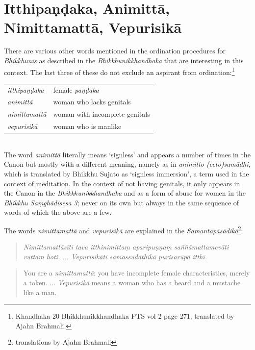 \section{Itthipaṇḍaka, Animittā, Nimittamattā, Vepurisikā}

There are various other words mentioned in the ordination procedures for {\em Bhikkhunīs} as described in the {\em Bhikkhunikkhandhaka} that are interesting in this context. The last three of these do not exclude an aspirant from ordination:\footnote{Khandhaka 20 Bhikkhunikkhandhaka PTS vol 2 page 271, translated by Ajahn Brahmali.} \\

\begin{tabular}{ l l }
 {\em itthipaṇḍaka} & female {\em paṇḍaka} \\
 {\em animittā } & woman who lacks genitals \\
 {\em nimittamattā } & woman with incomplete genitals \\ 
 {\em vepurisikā } & woman who is manlike \\
\end{tabular} \\

The word {\em animittā} literally means `signless' and appears a number of times in the Canon but mostly with a different meaning, namely as in {\em animitto (ceto)samādhi}, which is translated by Bhikkhu Sujato as `signless immersion', a term used in the context of meditation. In the context of not having genitals, it only appears in the Canon in the {\em Bhikkhunikkhandhaka} and as a form of abuse for women in the {\em Bhikkhu Saṃ­ghā­di­sesa­ 3}; never on its own but always in the same sequence of words of which the above are a few.

The words {\em nimittamattā} and {\em vepurisikā} are explained in the {\em Samantapāsādikā}\footnote{translations by Ajahn Brahmali}:
\begin{quote}
{\em Nimittamattāsīti tava itthinimittaṃ aparipuṇṇaṃ saññāmattamevāti vuttaṃ hoti.
...
Vepurisikāti samassudāṭhikā purisarūpā itthī.}
\end{quote}

\begin{quote}
You are a {\em nimittamattā}: you have incomplete female characteristics, merely a token.
...
{\em Vepurisikā} means a woman who has a beard and a mustache like a man.
\end{quote}

